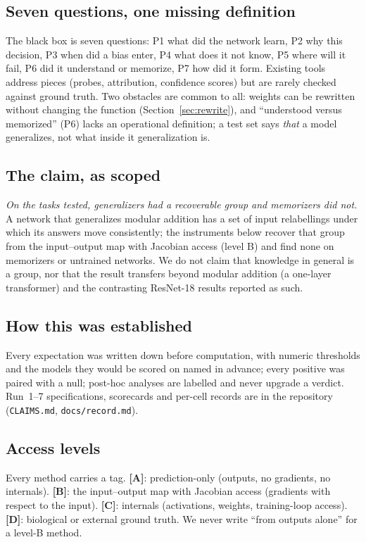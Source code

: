 \documentclass[11pt]{article}
\newcommand{\Lev}[1]{\textbf{\textsc{[#1]}}}
\begin{document}
\subsection{Seven questions, one missing definition}
The black box is seven questions: P1 what did the network learn, P2 why this decision, P3 when did a bias enter, P4 what does it not know, P5 where will it fail, P6 did it understand or memorize, P7 how did it form. Existing tools address pieces (probes, attribution, confidence scores) but are rarely checked against ground truth. Two obstacles are common to all: weights can be rewritten without changing the function (Section~\ref{sec:rewrite}), and ``understood versus memorized'' (P6) lacks an operational definition; a test set says \emph{that} a model generalizes, not what inside it generalization is.

\subsection{The claim, as scoped}
\emph{On the tasks tested, generalizers had a recoverable group and memorizers did not.} A network that generalizes modular addition has a set of input relabellings under which its answers move consistently; the instruments below recover that group from the input--output map with Jacobian access (level B) and find none on memorizers or untrained networks. We do not claim that knowledge in general is a group, nor that the result transfers beyond modular addition (a one-layer transformer) and the contrasting ResNet-18 results reported as such.

\subsection{How this was established}
Every expectation was written down before computation, with numeric thresholds and the models they would be scored on named in advance; every positive was paired with a null; post-hoc analyses are labelled and never upgrade a verdict. Run~1--7 specifications, scorecards and per-cell records are in the repository (\texttt{CLAIMS.md}, \texttt{docs/record.md}).

\subsection{Access levels}
Every method carries a tag. \Lev{A}: prediction-only (outputs, no gradients, no internals). \Lev{B}: the input--output map with Jacobian access (gradients with respect to the input). \Lev{C}: internals (activations, weights, training-loop access). \Lev{D}: biological or external ground truth. We never write ``from outputs alone'' for a level-B method.
\end{document}
